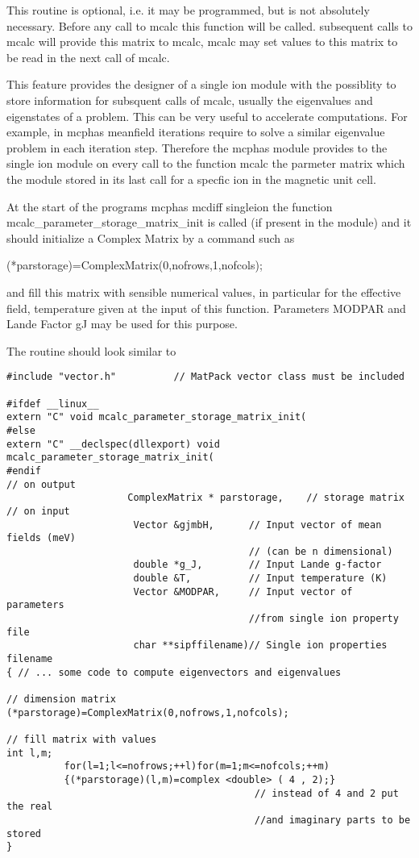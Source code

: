 This routine is optional, i.e. it may be programmed, but is not absolutely necessary.
Before any call to mcalc this function will be called. subsequent calls to mcalc will provide this matrix to %
mcalc, mcalc may set values to this matrix to be read in the next call
of mcalc.

This feature provides the designer of a single ion module  with the possiblity to store information for subsquent %
calls of mcalc,
 usually the eigenvalues and eigenstates of a problem. This can be very useful to accelerate computations. For %
example, in {\prg mcphas} meanfield iterations require
to solve a similar eigenvalue problem in each iteration step. Therefore the {\prg mcphas} module provides
to the single ion module on every call to the function {\prg mcalc} the parmeter matrix {\prg }
which the module stored in its last call for a specfic ion in the magnetic unit cell.

At the start of the programs {\prg mcphas} {\prg mcdiff} {\prg singleion} the function {\prg %
mcalc\_parameter\_storage\_matrix\_init}
is called (if present in the module) and it should initialize a Complex Matrix by a command such as

{\prg (*parstorage)=ComplexMatrix(0,nofrows,1,nofcols);}

and fill this matrix with sensible numerical values, in particular for the effective field, temperature given at %
the input of this function.
Parameters {\prg MODPAR} and Lande Factor {\prg gJ} may be used for this purpose.

The routine should look similar to
{\footnotesize
\begin{verbatim}
#include "vector.h"          // MatPack vector class must be included

#ifdef __linux__
extern "C" void mcalc_parameter_storage_matrix_init(
#else
extern "C" __declspec(dllexport) void mcalc_parameter_storage_matrix_init(
#endif
// on output
                     ComplexMatrix * parstorage,    // storage matrix
// on input
                      Vector &gjmbH,      // Input vector of mean fields (meV)
					                      // (can be n dimensional)
                      double *g_J,        // Input Lande g-factor
                      double &T,          // Input temperature (K)
                      Vector &MODPAR,     // Input vector of parameters 
					                      //from single ion property file
                      char **sipffilename)// Single ion properties filename
{ // ... some code to compute eigenvectors and eigenvalues

// dimension matrix
(*parstorage)=ComplexMatrix(0,nofrows,1,nofcols);

// fill matrix with values
int l,m;
          for(l=1;l<=nofrows;++l)for(m=1;m<=nofcols;++m)
          {(*parstorage)(l,m)=complex <double> ( 4 , 2);}
                                           // instead of 4 and 2 put the real 
										   //and imaginary parts to be stored
}
\end{verbatim}
}


